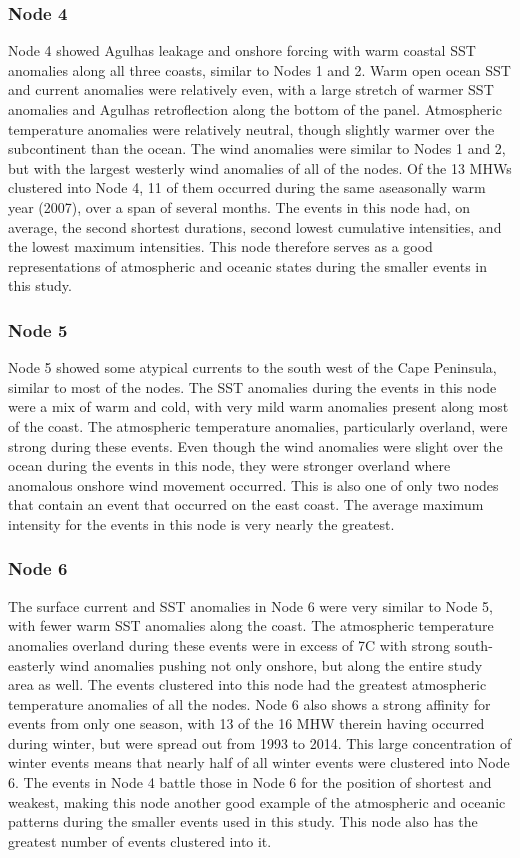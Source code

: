 \documentclass[utf8]{frontiersSCNS}
\begin{document}
\subsubsection{Node 4}
Node 4 showed Agulhas leakage and onshore forcing with warm coastal SST anomalies along all three coasts, similar to Nodes 1 and 2. Warm open ocean SST and current anomalies were relatively even, with a large stretch of warmer SST anomalies and Agulhas retroflection along the bottom of the panel. Atmospheric temperature anomalies were relatively neutral, though slightly warmer over the subcontinent than the ocean. The wind anomalies were similar to Nodes 1 and 2, but with the largest westerly wind anomalies of all of the nodes. Of the 13 MHWs clustered into Node 4, 11 of them occurred during the same aseasonally warm year (2007), over a span of several months. The events in this node had, on average, the second shortest durations, second lowest cumulative intensities, and the lowest maximum intensities. This node therefore serves as a good representations of atmospheric and oceanic states during the smaller events in this study.

\subsubsection{Node 5}
Node 5 showed some atypical currents to the south west of the Cape Peninsula, similar to most of the nodes. The SST anomalies during the events in this node were a mix of warm and cold, with very mild warm anomalies present along most of the coast. The atmospheric temperature anomalies, particularly overland, were strong during these events. Even though the wind anomalies were slight over the ocean during the events in this node, they were stronger overland where anomalous onshore wind movement occurred. This is also one of only two nodes that contain an event that occurred on the east coast. The average maximum intensity for the events in this node is very nearly the greatest.

\subsubsection{Node 6}
The surface current and SST anomalies in Node 6 were very similar to Node 5, with fewer warm SST anomalies along the coast. The atmospheric temperature anomalies overland during these events were in excess of 7\degree C with strong south-easterly wind anomalies pushing not only onshore, but along the entire study area as well. The events clustered into this node had the greatest atmospheric temperature anomalies of all the nodes. Node 6 also shows a strong affinity for events from only one season, with 13 of the 16 MHW therein having occurred during winter, but were spread out from 1993 to 2014. This large concentration of winter events means that nearly half of all winter events were clustered into Node 6. The events in Node 4 battle those in Node 6 for the position of shortest and weakest, making this node another good example of the atmospheric and oceanic patterns during the smaller events used in this study. This node also has the greatest number of events clustered into it.
\end{document}
